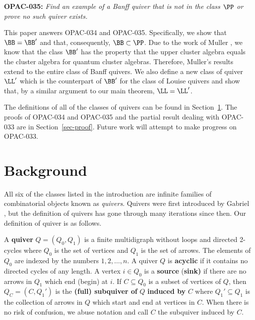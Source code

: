 \textbf{OPAC-035:} \textit{Find an example of a Banff quiver that is not in the class $\PP$ or prove no such quiver exists.}

This paper answers OPAC-034 and OPAC-035.
Specifically, we show that $\BB = \BB'$ and that, consequently, $\BB \subset \PP$.
Due to the work of Muller \cite[Lemma 8.13]{MR3551171}, we know that the class $\BB'$ has the property that the upper cluster algebra equals the cluster algebra for quantum cluster algebras. 
Therefore, Muller's results extend to the entire class of Banff quivers.
We also define a new class of quiver $\LL'$ which is the counterpart of $\BB'$ for the class of Louise quivers and show that, by a similar argument to our main theorem, $\LL = \LL'$. 

The definitions of all of the classes of quivers can be found in Section~\ref{sec-background}.
The proofs of OPAC-034 and OPAC-035 and the partial result dealing with OPAC-033 are in Section~\ref{sec-proof}. 
Future work will attempt to make progress on OPAC-033.

\section{Background}\label{sec-background}

All six of the classes listed in the introduction are infinite families of combinatorial objects known as \textit{quivers}.
Quivers were first introduced by Gabriel \cite{MR0332887}, but the definition of quivers has gone through many iterations since then.
Our definition of quiver is as follows.

\begin{defi}\label{def-quiver}
    A \textbf{quiver} $Q = (Q_0, Q_1)$ is a finite multidigraph without loops and directed 2-cycles where $Q_0$ is the set of vertices and $Q_1$ is the set of arrows.
    The elements of $Q_0$ are indexed by the numbers $1, 2, \ldots, n$. 
    A quiver $Q$ is \textbf{acyclic} if it contains no directed cycles of any length.
    A vertex $i \in Q_0$ is a \textbf{source} (\resp \textbf{sink)} if there are no arrows in $Q_1$ which end (\resp begin) at $i$.
    If $C \subseteq Q_0$ is a subset of vertices of $Q$, then $Q_C = (C, Q_1')$ is the \textbf{(full) subquiver of} $Q$ \textbf{induced by} $C$ where $Q_1' \subseteq Q_1$ is the collection of arrows in $Q$ which start and end at vertices in $C$.
    When there is no risk of confusion, we abuse notation and call $C$ the subquiver induced by $C$.
\end{defi}

